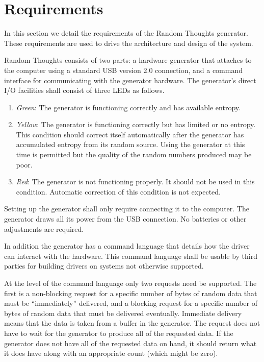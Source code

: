 
\chapter{Requirements}
\label{chapt:requirements}

In this section we detail the requirements of the Random Thoughts generator. These requirements
are used to drive the architecture and design of the system.

Random Thoughts consists of two parts: a hardware generator that attaches to the computer using
a standard USB version 2.0 connection, and a command interface for communicating with the
generator hardware. The generator's direct I/O facilities shall consist of three LEDs as
follows.

\begin{enumerate}
\item \textit{Green}: The generator is functioning correctly and has available entropy.

\item \textit{Yellow}: The generator is functioning correctly but has limited or no entropy.
  This condition should correct itself automatically after the generator has accumulated entropy
  from its random source. Using the generator at this time is permitted but the quality of the
  random numbers produced may be poor.

\item \textit{Red}: The generator is not functioning properly. It should not be used in this
  condition. Automatic correction of this condition is not expected.
\end{enumerate}

Setting up the generator shall only require connecting it to the computer. The generator draws
all its power from the USB connection. No batteries or other adjustments are required.

In addition the generator has a command language that details how the driver can interact with
the hardware. This command language shall be usable by third parties for building drivers on
systems not otherwise supported.

At the level of the command language only two requests need be supported. The first is a
non-blocking request for a specific number of bytes of random data that must be ``immediately''
delivered, and a blocking request for a specific number of bytes of random data that must be
delivered eventually. Immediate delivery means that the data is taken from a buffer in the
generator. The request does not have to wait for the generator to produce all of the requested
data. If the generator does not have all of the requested data on hand, it should return what it
does have along with an appropriate count (which might be zero).

